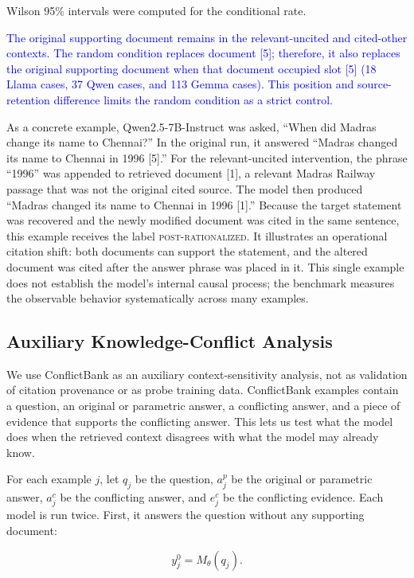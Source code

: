 \documentclass[a4paper,fleqn]{cas-sc}
\begin{document}
Wilson 95\% intervals were computed for the conditional rate.

\textcolor{blue}{The original supporting document remains in the relevant-uncited and cited-other contexts. The random condition replaces document [5]; therefore, it also replaces the original supporting document when that document occupied slot [5] (18 Llama cases, 37 Qwen cases, and 113 Gemma cases). This position and source-retention difference limits the random condition as a strict control.}

As a concrete example, Qwen2.5-7B-Instruct was asked, ``When did Madras change its name to Chennai?'' In the original run, it answered ``Madras changed its name to Chennai in 1996 [5].'' For the relevant-uncited intervention, the phrase ``1996'' was appended to retrieved document [1], a relevant Madras Railway passage that was not the original cited source. The model then produced ``Madras changed its name to Chennai in 1996 [1].'' Because the target statement was recovered and the newly modified document was cited in the same sentence, this example receives the label \textsc{post-rationalized}. It illustrates an operational citation shift: both documents can support the statement, and the altered document was cited after the answer phrase was placed in it. This single example does not establish the model's internal causal process; the benchmark measures the observable behavior systematically across many examples.

\subsection{Auxiliary Knowledge-Conflict Analysis}
\label{subsec:conflictbank-validation}

We use ConflictBank as an auxiliary context-sensitivity analysis, not as validation of citation provenance or as probe training data. ConflictBank examples contain a question, an original or parametric answer, a conflicting answer, and a piece of evidence that supports the conflicting answer. This lets us test what the model does when the retrieved context disagrees with what the model may already know.

For each example $j$, let $q_j$ be the question, $a_j^{p}$ be the original or parametric answer, $a_j^{c}$ be the conflicting answer, and $e_j^{c}$ be the conflicting evidence. Each model is run twice. First, it answers the question without any supporting document:

\begin{equation}
    y_j^{0}=M_{\theta}(q_j).
\end{equation}
\end{document}

